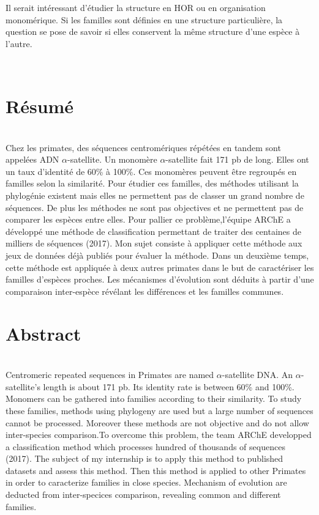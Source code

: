 \documentclass[12pt,a4paper]{article}
\begin{document}
	Il serait intéressant d'étudier la structure en HOR ou en organisation monomérique. Si les familles sont définies en une structure particulière, la question se pose de savoir si elles conservent la même structure d'une espèce à l'autre.

\newpage
\strut  ~  \mbox{}  \null
\newpage



\newpage 
\thispagestyle{empty}
\section*{Résumé}~\\[0.2cm]
Chez les primates, des séquences centromériques répétées en tandem sont appelées ADN $\alpha$-satellite. Un monomère $\alpha$-satellite fait 171 pb de long. Elles ont un taux d'identité de 60\% à 100\%. Ces monomères peuvent être regroupés en familles selon la similarité. Pour étudier ces familles, des méthodes utilisant la phylogénie existent mais elles ne permettent pas de classer un grand nombre de séquences. De plus les méthodes ne sont pas objectives et ne permettent pas de comparer les espèces entre elles. Pour pallier ce problème,l'équipe ARChE a développé une méthode de classification permettant de traiter des centaines de milliers de séquences (2017). Mon sujet consiste à appliquer cette méthode aux jeux de données déjà publiés pour évaluer la méthode. Dans un deuxième temps, cette méthode est appliquée à deux autres primates dans le but de  caractériser les familles d'espèces proches. Les mécanismes d'évolution sont déduits à partir d'une comparaison inter-espèce révélant les différences et les familles communes. 

\section*{Abstract}~\\[0.2cm]
Centromeric repeated sequences in Primates are named $\alpha$-satellite DNA. An $\alpha$-satellite's length is about 171 pb. Its identity rate is between 60\% and 100\%. Monomers can be gathered into families according to their similarity. To study these families, methods using phylogeny are used but a large number of sequences cannot be processed. Moreover these methods are not objective and do not allow inter-species comparison.To overcome this problem, the team ARChE developped a classification method which processes hundred of thousands of sequences (2017). The subject of my internship is to apply this method to published datasets and assess this method. Then this method is applied to other Primates in order to caracterize families in close species. Mechanism of evolution are deducted from inter-specices comparison, revealing common and different families. 
\end{document}
